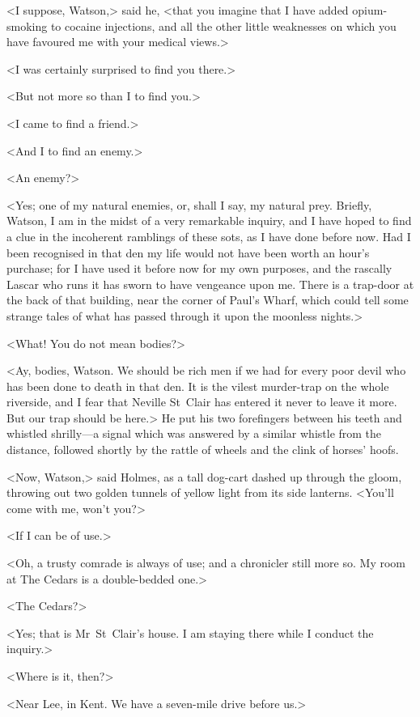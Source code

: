 <I suppose, Watson,> said he, <that you imagine that I have added opium-smoking to cocaine injections, and all the other little weaknesses on which you have favoured me with your medical views.>

<I was certainly surprised to find you there.>

<But not more so than I to find you.>

<I came to find a friend.>

<And I to find an enemy.>

<An enemy?>

<Yes; one of my natural enemies, or, shall I say, my natural prey. Briefly, Watson, I am in the midst of a very remarkable inquiry, and I have hoped to find a clue in the incoherent ramblings of these sots, as I have done before now. Had I been recognised in that den my life would not have been worth an hour's purchase; for I have used it before now for my own purposes, and the rascally Lascar who runs it has sworn to have vengeance upon me. There is a trap-door at the back of that building, near the corner of Paul's Wharf, which could tell some strange tales of what has passed through it upon the moonless nights.>

<What! You do not mean bodies?>

<Ay, bodies, Watson. We should be rich men if we had  for every poor devil who has been done to death in that den. It is the vilest murder-trap on the whole riverside, and I fear that Neville St~Clair has entered it never to leave it more. But our trap should be here.> He put his two forefingers between his teeth and whistled shrilly—a signal which was answered by a similar whistle from the distance, followed shortly by the rattle of wheels and the clink of horses' hoofs.

<Now, Watson,> said Holmes, as a tall dog-cart dashed up through the gloom, throwing out two golden tunnels of yellow light from its side lanterns. <You'll come with me, won't you?>

<If I can be of use.>

<Oh, a trusty comrade is always of use; and a chronicler still more so. My room at The Cedars is a double-bedded one.>

<The Cedars?>

<Yes; that is Mr~St~Clair's house. I am staying there while I conduct the inquiry.>

<Where is it, then?>

<Near Lee, in Kent. We have a seven-mile drive before us.>

